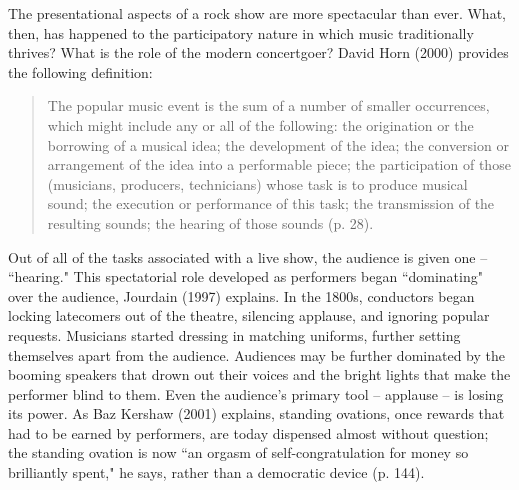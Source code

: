 The presentational aspects of a rock show are more spectacular than ever. What, then, has happened to the participatory nature in which music traditionally thrives? What is the role of the modern concertgoer? David Horn (2000) provides the following definition:
\begin{quotation}
The popular music event is the sum of a number of smaller occurrences, which might include any or all of the following: the origination or the borrowing of a musical idea; the development of the idea; the conversion or arrangement of the idea into a performable piece; the participation of those (musicians, producers, technicians) whose task is to produce musical sound; the execution or performance of this task; the transmission of the resulting sounds; the hearing of those sounds (p. 28).
\end{quotation}
Out of all of the tasks associated with a live show, the audience is given one -- ``hearing." This spectatorial role developed as performers began ``dominating" over the audience, Jourdain (1997) explains. In the 1800s, conductors began locking latecomers out of the theatre, silencing applause, and ignoring popular requests. Musicians started dressing in matching uniforms, further setting themselves apart from the audience. Audiences may be further dominated by the booming speakers that drown out their voices and the bright lights that make the performer blind to them. Even the audience's primary tool -- applause -- is losing its power. As Baz Kershaw (2001) explains, standing ovations, once rewards that had to be earned by performers, are today dispensed almost without question; the standing ovation is now ``an orgasm of self-congratulation for money so brilliantly spent," he says, rather than a democratic device (p. 144).
